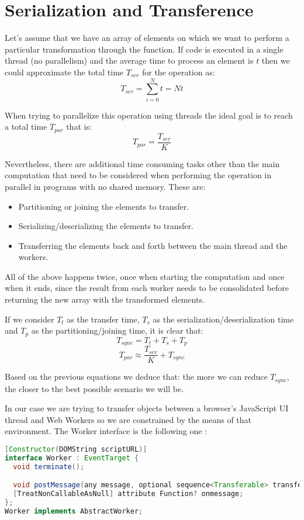 \section{Serialization and Transference}
\label{sec:serialization-and-transference}

Let's assume that we have an array of  elements on which we want to perform a particular transformation through the  function. If code is executed in a single thread (no parallelism) and the average time to process an element is \(t\) then we could approximate the total time \(T_{ser}\) for the operation as:
\[T_{ser} = \sum_{i = 0}^{N}t = Nt\]

When trying to parallelize this operation using  threads the ideal goal is to reach a total time \(T_{par}\) that is:
\[T_{par} = \frac{T_{ser}}{K}\]

Nevertheless, there are additional time consuming tasks other than the main computation that need to be considered when performing the operation in parallel in programs with no shared memory. These are:
\begin{itemize}
  \item Partitioning or joining the elements to transfer.
  \item Serializing/deserializing the elements to transfer.
  \item Transferring the elements back and forth between the main thread and the workers.
\end{itemize}

All of the above happens twice, once when starting the computation and once when it ends, since the result from each worker needs to be consolidated before returning the new array with the transformed elements.

If we consider \(T_{t}\) as the transfer time, \(T_{s}\) as the serialization/deserialization time and \(T_{p}\) as the partitioning/joining time, it is clear that:
\[T_{sync} = T_{t} + T_{s} + T_{p}\]
\[T_{par} \approx \frac{T_{ser}}{K} + T_{sync}\]

Based on the previous equations we deduce that: the more we can reduce \(T_{sync}\), the closer to the best possible scenario we will be.

In our case we are trying to transfer objects between a browser's JavaScript UI thread and Web Workers so we are constrained by the means of that environment. The Worker interface is the following one \cite{w3c-ww}:
\begin{lstlisting}[language=Java, caption=The Worker interface]
[Constructor(DOMString scriptURL)]
interface Worker : EventTarget {
  void terminate();

  void postMessage(any message, optional sequence<Transferable> transfer);
  [TreatNonCallableAsNull] attribute Function? onmessage;
};
Worker implements AbstractWorker;
\end{lstlisting}

